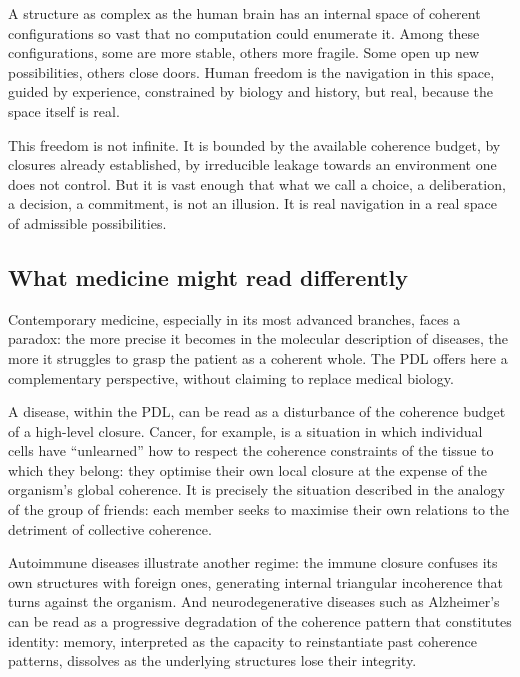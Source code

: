 \documentclass[12pt, a4paper, openright]{book}
\begin{document}
A structure as complex as the human brain has an internal space of coherent configurations so vast that no computation could enumerate it. Among these configurations, some are more stable, others more fragile. Some open up new possibilities, others close doors. Human freedom is the navigation in this space, guided by experience, constrained by biology and history, but real, because the space itself is real.

\medskip

This freedom is not infinite. It is bounded by the available coherence budget, by closures already established, by irreducible leakage towards an environment one does not control. But it is vast enough that what we call a choice, a deliberation, a decision, a commitment, is not an illusion. It is real navigation in a real space of admissible possibilities.

\subsection*{What medicine might read differently}

Contemporary medicine, especially in its most advanced branches, faces a paradox: the more precise it becomes in the molecular description of diseases, the more it struggles to grasp the patient as a coherent whole. The PDL offers here a complementary perspective, without claiming to replace medical biology.

\medskip

A disease, within the PDL, can be read as a disturbance of the coherence budget of a high-level closure. Cancer, for example, is a situation in which individual cells have “unlearned” how to respect the coherence constraints of the tissue to which they belong: they optimise their own local closure at the expense of the organism’s global coherence. It is precisely the situation described in the analogy of the group of friends: each member seeks to maximise their own relations to the detriment of collective coherence.

\medskip

Autoimmune diseases illustrate another regime: the immune closure confuses its own structures with foreign ones, generating internal triangular incoherence that turns against the organism. And neurodegenerative diseases such as Alzheimer’s can be read as a progressive degradation of the coherence pattern that constitutes identity: memory, interpreted as the capacity to reinstantiate past coherence patterns, dissolves as the underlying structures lose their integrity.
\end{document}
